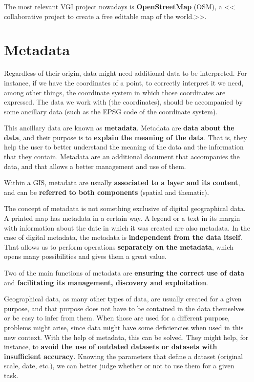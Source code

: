 The most relevant VGI project nowadays is \textbf{OpenStreetMap} (OSM), a << collaborative project to create a free editable map of the world.>>.


\section{Metadata}

Regardless of their origin, data might need additional data to be interpreted. For instance, if we have the coordinates of a point, to correctly interpret it we need, among other things, the coordinate system in which those coordinates are expressed. The data we work with (the coordinates), should be accompanied by some ancillary data (such as the EPSG code of the coordinate system).

This ancillary data are known as \textbf{metadata}. Metadata are \textbf{data about the data}, and their purpose is to \textbf{explain the meaning of the data}. That is, they help the user to better understand the meaning of the data and the information that they contain. Metadata are an additional document that accompanies the data, and that allows a better management and use of them.

Within a GIS, metadata are usually \textbf{associated to a layer and its content}, and can be \textbf{referred to both components} (spatial and thematic).

The concept of metadata is not something exclusive of digital geographical data. A printed map has metadata in a certain way. A legend or a text in its margin with information about the date in which it was created are also metadata. In the case of digital metadata, the metadata is \textbf{independent from the data itself}. That allows us to perform operations \textbf{separately on the metadata}, which opens many possibilities and gives them a great value.

Two of the main functions of metadata are \textbf{ensuring the correct use of data} and \textbf{facilitating its management, discovery and exploitation}.

Geographical data, as many other types of data, are usually created for a given purpose, and that purpose does not have to be contained in the data themselves or be easy to infer from them. When those are used for a different purpose, problems might arise, since data might have some deficiencies when used in this new context. With the help of metadata, this can be solved. They might help, for instance, to \textbf{avoid the use of outdated datasets or datasets with insufficient accuracy}. Knowing the parameters that define a dataset (original scale, date, etc.), we can better judge whether or not to use them for a given task.

